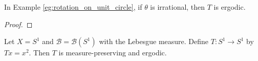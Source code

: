     \begin{proposition}\label{prop:irrational_rotation_is_ergodic}
        In Example \ref{eg:rotation_on_unit_circle}, if \(\theta\) is irrational, then \(T\) is ergodic.
    \end{proposition}
    \begin{proof}
    \end{proof}

    \begin{example}\label{eg:power_map_on_unit_circle_is_ergodic}
        Let \(X = S^1\) and \(\mathcal{B} = \mathcal{B}(S^1)\) with the Lebesgue measure.
        Define \(T:S^1 \to S^1\) by \(Tx = x^2\).
        Then \(T\) is measure-preserving and ergodic.

    \end{example}